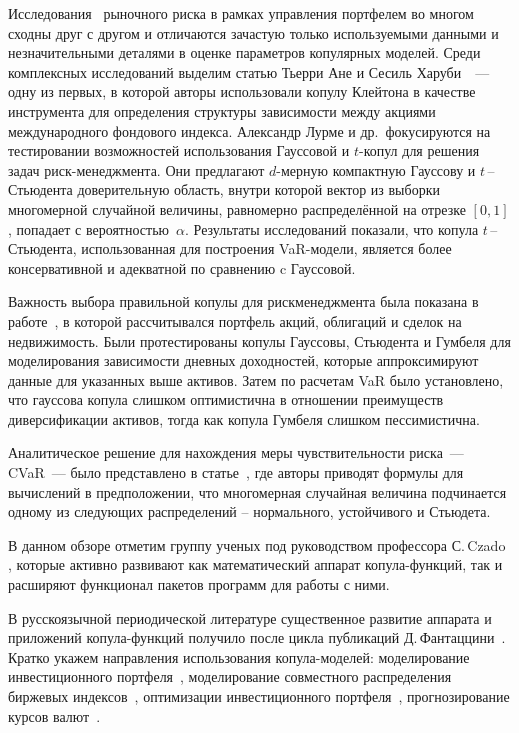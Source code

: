 Исследования~\cite{Ane2003, Kole2007, Lourme2016, Xu2008} рыночного риска в рамках управления портфелем во многом сходны друг с другом и отличаются зачастую только используемыми данными и незначительными деталями в оценке параметров копулярных моделей. 
Среди комплексных исследований выделим статью Тьерри Ане и Сесиль Харуби~\cite{Ane2003}~--- одну из первых, в которой авторы использовали копулу Клейтона в качестве инструмента для определения структуры зависимости между акциями международного фондового индекса.
Александр Лурме и др.\,\cite{Lourme2016} фокусируются на тестировании возможностей использования Гауссовой и $t$-копул для решения задач риск-менеджмента. 
Они предлагают $d$-мерную компактную Гауссову и $t$\,--\,Стьюдента  доверительную область, внутри которой вектор из выборки многомерной случайной величины, равномерно распределённой на отрезке $[0, 1]$, попадает с вероятностью~$\alpha$.
Результаты исследований показали, что копула $t$\,--\,Стьюдента, использованная для построения VaR-модели, является более консервативной и адекватной по сравнению c Гауссовой.

Важность выбора правильной копулы для риск\-менеджмента была показана в работе~\cite{Kole2007}, в которой рассчитывался портфель акций, облигаций и сделок на недвижимость.
Были протестированы копулы Гауссовы, Стьюдента и Гумбеля для моделирования зависимости дневных доходностей, которые аппроксимируют данные для указанных выше активов. 
Затем по расчетам VaR было установлено, что гауссова копула слишком оптимистична в отношении преимуществ диверсификации активов, тогда как копула Гумбеля слишком пессимистична.

Аналитическое решение для нахождения меры чувствительности риска~--- CVaR~--- было представлено в статье~\cite{Stoyanov2013}, где авторы приводят формулы для вычислений в предположении, что многомерная случайная величина подчинается одному из следующих распределений -- нормального, устойчивого и Стьюдета.

В данном обзоре отметим группу ученых под руководством профессора С.\,Czado \cite{Czado2010, Dissmann2013, Klup2017}, которые активно развивают как математический аппарат копула-функций, так и расширяют функционал пакетов программ для работы с ними.

В русскоязычной периодической литературе существенное развитие аппарата и приложений копула-функций получило после цикла публикаций Д.\,Фантаццини~\cite{Fantazzini2011}. Кратко укажем  направления использования копула-моделей: моделирование инвестиционного портфеля~\cite{Penikas2010, Penikas2014, Travkin2013}, моделирование совместного распределения биржевых индексов~\cite{Knyazev2016}, оптимизации
инвестиционного портфеля~\cite{Atskanov2016}, прогнозирование курсов валют~\cite{Antonov2016}.

